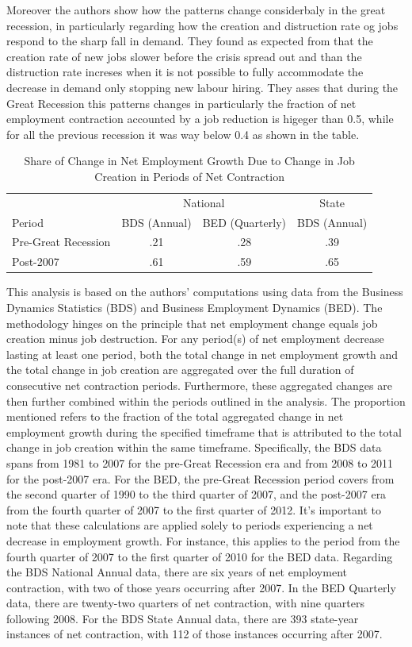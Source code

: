 \documentclass[12pt]{article}
\begin{document}
Moreover the authors show how the patterns change considerbaly in the great recession, in particularly regarding how the
creation and distruction rate og jobs respond to the sharp fall in demand. They found as expected from \cite{CabHarm94}
that the creation rate of new jobs slower before the crisis spread out and than the distruction rate increses when it is
not possible to fully accommodate the decrease in demand only stopping new labour hiring. They asses that during the
Great Recession this patterns changes in particularly the fraction of net employment  contraction accounted by a job
reduction is higeger than 0.5, while for all the previous recession it was way below 0.4 as shown in the table.
\begin{table}[H]
    \centering
    \caption{
    Share of Change in Net Employment Growth Due to Change in Job Creation in Periods of Net Contraction}

    \begin{tabular}{lccc}
    \hline & \multicolumn{2}{c}{ National } & State \\
    \cline { 2 - 3 } Period & BDS (Annual) & BED (Quarterly) & BDS (Annual) \\
    \hline Pre-Great Recession & .21 & .28 & .39 \\
    Post-2007 & .61 & .59 & .65 \\
    \hline
    \end{tabular}
    \label{tab:1.2}
\end{table}

This analysis is based on the authors' computations using data from the Business Dynamics Statistics (BDS) and Business
Employment Dynamics (BED). The methodology hinges on the principle that net employment change equals job creation minus
job destruction. For any period(s) of net employment decrease lasting at least one period, both the total change in net
employment growth and the total change in job creation are aggregated over the full duration of consecutive net
contraction periods. Furthermore, these aggregated changes are then further combined within the periods outlined in the
analysis. The proportion mentioned refers to the fraction of the total aggregated change in net employment growth during
the specified timeframe that is attributed to the total change in job creation within the same timeframe. Specifically,
the BDS data spans from 1981 to 2007 for the pre-Great Recession era and from 2008 to 2011 for the post-2007 era. For
the BED, the pre-Great Recession period covers from the second quarter of 1990 to the third quarter of 2007, and the
post-2007 era from the fourth quarter of 2007 to the first quarter of 2012. It's important to note that these
calculations are applied solely to periods experiencing a net decrease in employment growth. For instance, this applies
to the period from the fourth quarter of 2007 to the first quarter of 2010 for the BED data. Regarding the BDS National
Annual data, there are six years of net employment contraction, with two of those years occurring after 2007. In the BED
Quarterly data, there are twenty-two quarters of net contraction, with nine quarters following 2008. For the BDS State
Annual data, there are 393 state-year instances of net contraction, with 112 of those instances occurring after 2007. 
\end{document}
